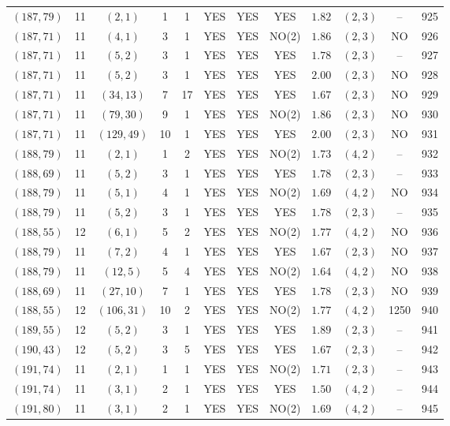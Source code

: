 \begin{longtable}{|c|c|c|c|c|c|c|c|c|c|c|c|}
$(187,79)$ & 11 & $(2,1)$ & 1 & 1 & YES & YES & YES & $1.82$ & $(2,3)$ & -- & 925\\
$(187,71)$ & 11 & $(4,1)$ & 3 & 1 & YES & YES & NO(2) & $1.86$ & $(2,3)$ & NO & 926\\
$(187,71)$ & 11 & $(5,2)$ & 3 & 1 & YES & YES & YES & $1.78$ & $(2,3)$ & -- & 927\\
$(187,71)$ & 11 & $(5,2)$ & 3 & 1 & YES & YES & YES & $2.00$ & $(2,3)$ & NO & 928\\
$(187,71)$ & 11 & $(34,13)$ & 7 & 17 & YES & YES & YES & $1.67$ & $(2,3)$ & NO & 929\\
$(187,71)$ & 11 & $(79,30)$ & 9 & 1 & YES & YES & NO(2) & $1.86$ & $(2,3)$ & NO & 930\\
$(187,71)$ & 11 & $(129,49)$ & 10 & 1 & YES & YES & YES & $2.00$ & $(2,3)$ & NO & 931\\
$(188,79)$ & 11 & $(2,1)$ & 1 & 2 & YES & YES & NO(2) & $1.73$ & $(4,2)$ & -- & 932\\
$(188,69)$ & 11 & $(5,2)$ & 3 & 1 & YES & YES & YES & $1.78$ & $(2,3)$ & -- & 933\\
$(188,79)$ & 11 & $(5,1)$ & 4 & 1 & YES & YES & NO(2) & $1.69$ & $(4,2)$ & NO & 934\\
$(188,79)$ & 11 & $(5,2)$ & 3 & 1 & YES & YES & YES & $1.78$ & $(2,3)$ & -- & 935\\
$(188,55)$ & 12 & $(6,1)$ & 5 & 2 & YES & YES & NO(2) & $1.77$ & $(4,2)$ & NO & 936\\
$(188,79)$ & 11 & $(7,2)$ & 4 & 1 & YES & YES & YES & $1.67$ & $(2,3)$ & NO & 937\\
$(188,79)$ & 11 & $(12,5)$ & 5 & 4 & YES & YES & NO(2) & $1.64$ & $(4,2)$ & NO & 938\\
$(188,69)$ & 11 & $(27,10)$ & 7 & 1 & YES & YES & YES & $1.78$ & $(2,3)$ & NO & 939\\
$(188,55)$ & 12 & $(106,31)$ & 10 & 2 & YES & YES & NO(2) & $1.77$ & $(4,2)$ & 1250 & 940\\
$(189,55)$ & 12 & $(5,2)$ & 3 & 1 & YES & YES & YES & $1.89$ & $(2,3)$ & -- & 941\\
$(190,43)$ & 12 & $(5,2)$ & 3 & 5 & YES & YES & YES & $1.67$ & $(2,3)$ & -- & 942\\
$(191,74)$ & 11 & $(2,1)$ & 1 & 1 & YES & YES & NO(2) & $1.71$ & $(2,3)$ & -- & 943\\
$(191,74)$ & 11 & $(3,1)$ & 2 & 1 & YES & YES & YES & $1.50$ & $(4,2)$ & -- & 944\\
$(191,80)$ & 11 & $(3,1)$ & 2 & 1 & YES & YES & NO(2) & $1.69$ & $(4,2)$ & -- & 945\\

\end{longtable}
